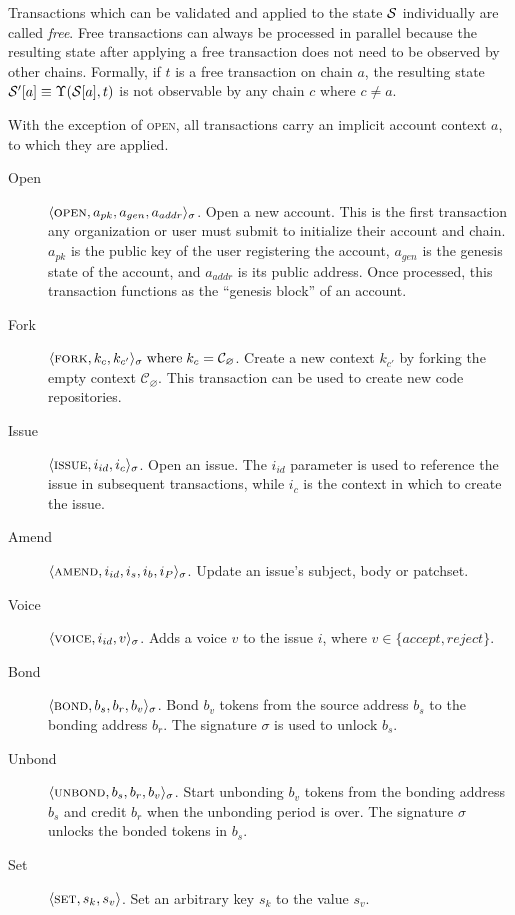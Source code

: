 Transactions which can be validated and applied to the state $\mathcal{S}$
individually are called \emph{free}. Free transactions can always be processed
in parallel because the resulting state after applying a free transaction does
not need to be observed by other chains. Formally, if $t$ is a free transaction
on chain $a$, the resulting state $\mathcal{S}'[a] \equiv \Upsilon(\mathcal{S}[a], t)$
is not observable by any chain $c$ where $c \neq a$.

With the exception of \textsc{open}, all transactions carry an implicit account
context $a$, to which they are applied.

\begin{description}
    \item[Open] $\langle \text{\normalfont\scshape open}, a_{pk}, a_{gen}, a_{addr} \rangle_{\sigma}$.  Open a new
        account. This is the first transaction any organization or user must
        submit to initialize their account and chain.  $a_{pk}$ is the public
        key of the user registering the account, $a_{gen}$ is the genesis state
        of the account, and $a_{addr}$ is its public address.  Once processed,
        this transaction functions as the ``genesis block'' of an account.
    \item[Fork] $\langle \text{\normalfont\scshape fork}, k_c, k_{c'} \rangle_\sigma \; \text{where} \; k_c =
        \mathcal{C}_{\varnothing}$. Create a new context $k_{c'}$ by forking
        the empty context $\mathcal{C}_{\varnothing}$. This transaction can
        be used to create new code repositories.
    \item[Issue] $\langle \text{\normalfont\scshape issue}, i_{id}, i_{c} \rangle_\sigma$. Open an issue. The $i_{id}$
        parameter is used to reference the issue in subsequent transactions,
        while $i_c$ is the context in which to create the issue.
    \item[Amend] $\langle \text{\normalfont\scshape amend}, i_{id}, i_{s}, i_{b}, i_P \rangle_\sigma$.
        Update an issue's subject, body or patchset.
    \item[Voice] $\langle \text{\normalfont\scshape voice}, i_{id}, v \rangle_\sigma$.  Adds a voice $v$ to the issue
        $i$, where $v \in \{accept, reject\}$.
    \item[Bond] $\langle \text{\normalfont\scshape bond}, b_{s}, b_{r}, b_{v} \rangle_{\sigma}$. Bond $b_v$ tokens
        from the source address $b_{s}$ to the bonding address $b_r$. The
        signature $\sigma$ is used to unlock $b_s$.
    \item[Unbond] $\langle \text{\normalfont\scshape unbond}, b_{s}, b_{r}, b_{v} \rangle_{\sigma}$. Start unbonding
        $b_v$ tokens from the bonding address $b_{s}$ and credit $b_r$ when
        the unbonding period is over. The signature $\sigma$ unlocks the
        bonded tokens in $b_s$.
    \item[Set] $\langle \text{\normalfont\scshape set}, s_k, s_v \rangle$. Set an arbitrary key $s_k$ to the value
        $s_v$.
\end{description}

